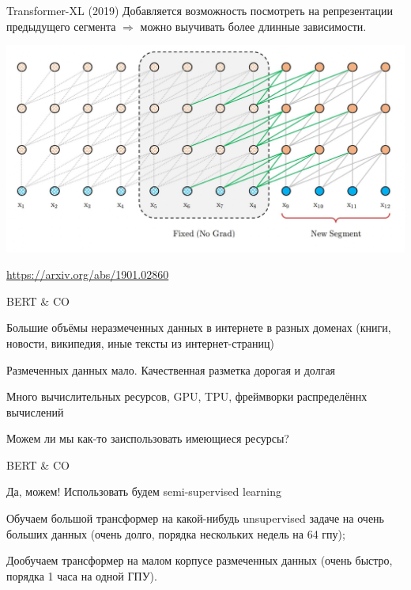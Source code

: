 \documentclass[notes,12pt, aspectratio=169]{beamer}
\newenvironment{wideitemize}{\itemize\addtolength{\itemsep}{10pt}}{\enditemize}
\begin{document}
\begin{frame}{Transformer-XL (2019)} 
	Добавляется возможность посмотреть на репрезентации предыдущего сегмента $\Rightarrow$ можно
	выучивать более длинные зависимости.
	\begin{center}
		\includegraphics[width=.7\linewidth]{xl_tr.png}
	\end{center}
	\vfill
	\footnotesize
	{\color{blue} \url{https://arxiv.org/abs/1901.02860}}
\end{frame}


\begin{frame}{BERT \& CO} 
		\begin{wideitemize}
			\item  Большие объёмы неразмеченных данных в интернете в разных доменах (книги,
			новости, википедия, иные тексты из интернет-страниц)
			\item  Размеченных данных мало. Качественная разметка дорогая и долгая
			\item  Много вычислительных ресурсов, GPU, TPU, фреймворки распределённх
			вычислений
			\item Можем ли мы как-то заиспользовать имеющиеся ресурсы?
		\end{wideitemize}
\end{frame}

\begin{frame}{BERT \& CO}
		\begin{wideitemize}
			\item  \alert{Да, можем! Использовать будем semi-supervised learning} 
			\item Обучаем большой трансформер на какой-нибудь unsupervised задаче на очень
			больших данных (очень долго, порядка нескольких недель на 64 гпу);
			\item Дообучаем трансформер на малом корпусе размеченных данных (очень быстро,
			порядка 1 часа на одной ГПУ).
		\end{wideitemize}
\end{frame}
\end{document}
